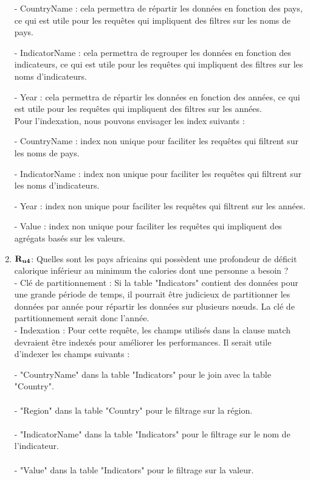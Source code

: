 \begin{enumerate}
- CountryName : cela permettra de répartir les données en fonction des pays, ce qui est utile pour les requêtes qui impliquent des filtres sur les noms de pays.

- IndicatorName : cela permettra de regrouper les données en fonction des indicateurs, ce qui est utile pour les requêtes qui impliquent des filtres sur les noms d'indicateurs.

- Year : cela permettra de répartir les données en fonction des années, ce qui est utile pour les requêtes qui impliquent des filtres sur les années.\\

Pour l'indexation, nous pouvons envisager les index suivants :

- CountryName : index non unique pour faciliter les requêtes qui filtrent sur les noms de pays.

- IndicatorName : index non unique pour faciliter les requêtes qui filtrent sur les noms d'indicateurs.

- Year : index non unique pour faciliter les requêtes qui filtrent sur les années.

- Value : index non unique pour faciliter les requêtes qui impliquent des agrégats basés sur les valeurs.
    \item ${\bf R_{u4}}$: Quelles sont les pays africains qui possèdent une profondeur de déficit calorique inférieur au minimum the calories dont une personne a besoin ?\\


- Clé de partitionnement :
Si la table "Indicators" contient des données pour une grande période de temps, il pourrait être judicieux de partitionner les données par année pour répartir les données sur plusieurs nœuds. La clé de partitionnement serait donc l'année.\\

- Indexation :
Pour cette requête, les champs utilisés dans la clause match devraient être indexés pour améliorer les performances. Il serait utile d'indexer les champs suivants :

- "CountryName" dans la table "Indicators" pour le join avec la table "Country".\\\\
- "Region" dans la table "Country" pour le filtrage sur la région.\\\\
- "IndicatorName" dans la table "Indicators" pour le filtrage sur le nom de l'indicateur.\\\\
- "Value" dans la table "Indicators" pour le filtrage sur la valeur.

\end{enumerate}

